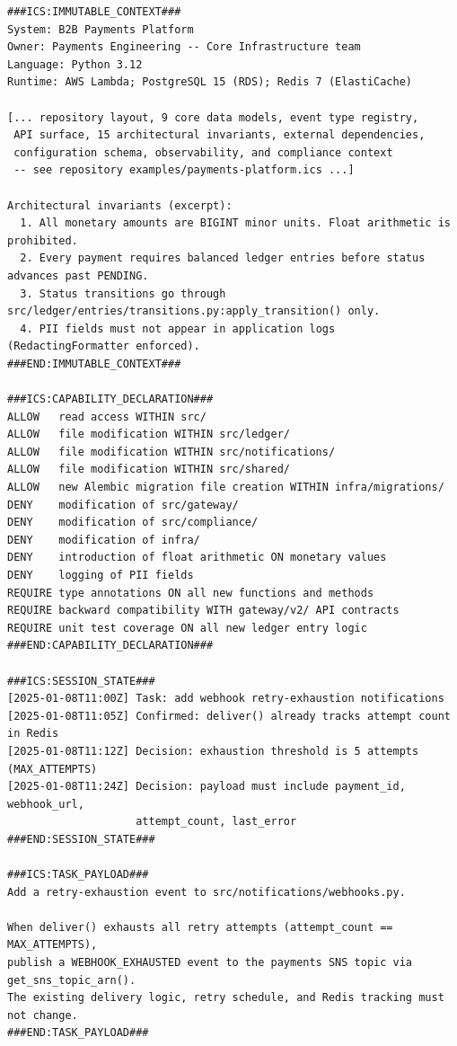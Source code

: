 \documentclass[11pt]{article}
\begin{document}
\begin{lstlisting}[language=ICS, basicstyle=\ttfamily\footnotesize]
###ICS:IMMUTABLE_CONTEXT###
System: B2B Payments Platform
Owner: Payments Engineering -- Core Infrastructure team
Language: Python 3.12
Runtime: AWS Lambda; PostgreSQL 15 (RDS); Redis 7 (ElastiCache)

[... repository layout, 9 core data models, event type registry,
 API surface, 15 architectural invariants, external dependencies,
 configuration schema, observability, and compliance context
 -- see repository examples/payments-platform.ics ...]

Architectural invariants (excerpt):
  1. All monetary amounts are BIGINT minor units. Float arithmetic is prohibited.
  2. Every payment requires balanced ledger entries before status advances past PENDING.
  3. Status transitions go through src/ledger/entries/transitions.py:apply_transition() only.
  4. PII fields must not appear in application logs (RedactingFormatter enforced).
###END:IMMUTABLE_CONTEXT###

###ICS:CAPABILITY_DECLARATION###
ALLOW   read access WITHIN src/
ALLOW   file modification WITHIN src/ledger/
ALLOW   file modification WITHIN src/notifications/
ALLOW   file modification WITHIN src/shared/
ALLOW   new Alembic migration file creation WITHIN infra/migrations/
DENY    modification of src/gateway/
DENY    modification of src/compliance/
DENY    modification of infra/
DENY    introduction of float arithmetic ON monetary values
DENY    logging of PII fields
REQUIRE type annotations ON all new functions and methods
REQUIRE backward compatibility WITH gateway/v2/ API contracts
REQUIRE unit test coverage ON all new ledger entry logic
###END:CAPABILITY_DECLARATION###

###ICS:SESSION_STATE###
[2025-01-08T11:00Z] Task: add webhook retry-exhaustion notifications
[2025-01-08T11:05Z] Confirmed: deliver() already tracks attempt count in Redis
[2025-01-08T11:12Z] Decision: exhaustion threshold is 5 attempts (MAX_ATTEMPTS)
[2025-01-08T11:24Z] Decision: payload must include payment_id, webhook_url,
                    attempt_count, last_error
###END:SESSION_STATE###

###ICS:TASK_PAYLOAD###
Add a retry-exhaustion event to src/notifications/webhooks.py.

When deliver() exhausts all retry attempts (attempt_count == MAX_ATTEMPTS),
publish a WEBHOOK_EXHAUSTED event to the payments SNS topic via get_sns_topic_arn().
The existing delivery logic, retry schedule, and Redis tracking must not change.
###END:TASK_PAYLOAD###


\end{lstlisting}
\end{document}
